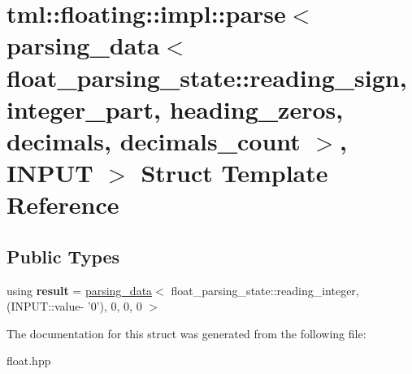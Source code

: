 \hypertarget{structtml_1_1floating_1_1impl_1_1parse_3_01parsing__data_3_01float__parsing__state_1_1reading__sb969a346611f33febdfae783bc0f66be}{\section{tml\+:\+:floating\+:\+:impl\+:\+:parse$<$ parsing\+\_\+data$<$ float\+\_\+parsing\+\_\+state\+:\+:reading\+\_\+sign, integer\+\_\+part, heading\+\_\+zeros, decimals, decimals\+\_\+count $>$, I\+N\+P\+U\+T $>$ Struct Template Reference}
\label{structtml_1_1floating_1_1impl_1_1parse_3_01parsing__data_3_01float__parsing__state_1_1reading__sb969a346611f33febdfae783bc0f66be}
}
\subsection*{Public Types}
\begin{DoxyCompactItemize}
\item 
\hypertarget{structtml_1_1floating_1_1impl_1_1parse_3_01parsing__data_3_01float__parsing__state_1_1reading__sb969a346611f33febdfae783bc0f66be_a0fbe2fe99e88e6fcf7d76364d97b1996}{using {\bfseries result} = \hyperlink{structtml_1_1floating_1_1impl_1_1parsing__data}{parsing\+\_\+data}$<$ float\+\_\+parsing\+\_\+state\+::reading\+\_\+integer,(I\+N\+P\+U\+T\+::value-\/ '0'), 0, 0, 0 $>$}\label{structtml_1_1floating_1_1impl_1_1parse_3_01parsing__data_3_01float__parsing__state_1_1reading__sb969a346611f33febdfae783bc0f66be_a0fbe2fe99e88e6fcf7d76364d97b1996}

\end{DoxyCompactItemize}


The documentation for this struct was generated from the following file\+:\begin{DoxyCompactItemize}
\item 
float.\+hpp\end{DoxyCompactItemize}
